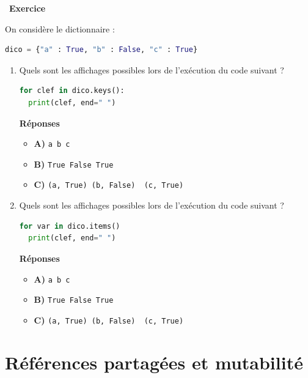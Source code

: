 \documentclass[
  11pt,
]{article}
\newcommand{\passthrough}[1]{#1}
\providecommand{\tightlist}{%
  \setlength{\itemsep}{0pt}\setlength{\parskip}{0pt}}
\newcounter{exo}
\newenvironment{exercice}[1]
{\par \medskip   \addtocounter{exo}{1} \noindent  
\begin{bclogo}[arrondi =0.1,   noborder = true, logo=\bccrayon, marge=4]{~\textbf{Exercice} \textbf{\theexo} {\itshape #1} }  \par}
{
\end{bclogo}
 \par \bigskip }
\newcounter{def}
\begin{document}
\begin{exercice}{}

On considère le dictionnaire :

\begin{lstlisting}[language=Python]
dico = {"a" : True, "b" : False, "c" : True}
\end{lstlisting}

\begin{enumerate}
\def\labelenumi{\arabic{enumi}.}
\item
  Quels sont les affichages possibles lors de l'exécution du code
  suivant ?

\begin{lstlisting}[language=Python]
for clef in dico.keys():
  print(clef, end=" ")
\end{lstlisting}

  \textbf{Réponses}

  \begin{itemize}
  \tightlist
  \item
    \textbf{A)} \passthrough{\lstinline!a b c!}
  \item
    \textbf{B)} \passthrough{\lstinline!True False True!}
  \item
    \textbf{C)}
    \passthrough{\lstinline!(a, True) (b, False)  (c, True)!}
  \end{itemize}
\item
  Quels sont les affichages possibles lors de l'exécution du code
  suivant ?

\begin{lstlisting}[language=Python]
for var in dico.items()
  print(clef, end=" ")
\end{lstlisting}

  \textbf{Réponses}

  \begin{itemize}
  \tightlist
  \item
    \textbf{A)} \passthrough{\lstinline!a b c!}
  \item
    \textbf{B)} \passthrough{\lstinline!True False True!}
  \item
    \textbf{C)}
    \passthrough{\lstinline!(a, True) (b, False)  (c, True)!}
  \end{itemize}
\end{enumerate}

\end{exercice}

\hypertarget{ruxe9fuxe9rences-partaguxe9es-et-mutabilituxe9}{%
\section{Références partagées et
mutabilité}\label{ruxe9fuxe9rences-partaguxe9es-et-mutabilituxe9}}
\end{document}
